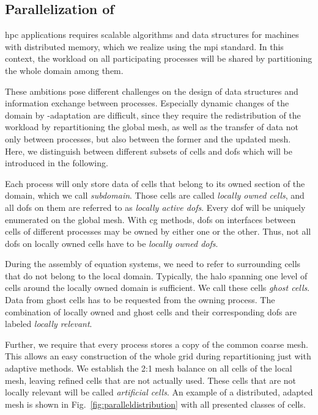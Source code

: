 \subsection{Parallelization of }

\Gls{hpc} applications requires scalable algorithms and data structures for machines with distributed memory, which we realize using the \gls{mpi} standard. In this context, the workload on all participating processes will be shared by partitioning the whole domain among them.

These ambitions pose different challenges on the design of data structures and information exchange between processes. Especially dynamic changes of the domain by \hp-adaptation are difficult, since they require the redistribution of the workload by repartitioning the global mesh, as well as the transfer of data not only between processes, but also between the former and the updated mesh. Here, we distinguish between different subsets of cells and \glspl{dof} which will be introduced in the following.

Each process will only store data of cells that belong to its owned section of the domain, which we call \textit{subdomain}. Those cells are called \textit{locally owned cells}, and all \glspl{dof} on them are referred to as \textit{locally active \glspl{dof}}. Every \gls{dof} will be uniquely enumerated on the global mesh. With \gls{cg} methods, \glspl{dof} on interfaces between cells of different processes may be owned by either one or the other. Thus, not all \glspl{dof} on locally owned cells have to be \textit{locally owned \glspl{dof}}.

During the assembly of equation systems, we need to refer to surrounding cells that do not belong to the local domain. Typically, the halo spanning one level of cells around the locally owned domain is sufficient. We call these cells \textit{ghost cells}. Data from ghost cells has to be requested from the owning process. The combination of locally owned and ghost cells and their corresponding \glspl{dof} are labeled \textit{locally relevant}.

Further, we require that every process stores a copy of the common coarse mesh. This allows an easy construction of the whole grid during repartitioning just with adaptive methods. We establish the 2:1 mesh balance on all cells of the local mesh, leaving refined cells that are not actually used. These cells that are not locally relevant will be called \textit{artificial cells}. An example of a distributed, adapted mesh is shown in Fig.~\ref{fig:paralleldistribution} with all presented classes of cells.

